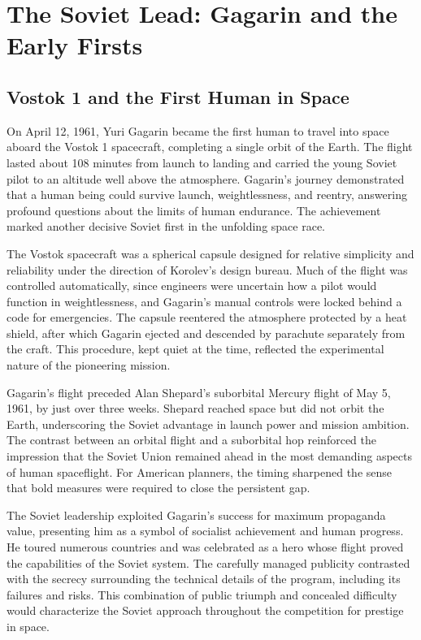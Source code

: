 \section{The Soviet Lead: Gagarin and the Early Firsts}

\subsection{Vostok 1 and the First Human in Space}
On April 12, 1961, Yuri Gagarin became the first human to travel into space aboard the Vostok 1 spacecraft, completing a single orbit of the Earth. The flight lasted about 108 minutes from launch to landing and carried the young Soviet pilot to an altitude well above the atmosphere. Gagarin's journey demonstrated that a human being could survive launch, weightlessness, and reentry, answering profound questions about the limits of human endurance. The achievement marked another decisive Soviet first in the unfolding space race.

The Vostok spacecraft was a spherical capsule designed for relative simplicity and reliability under the direction of Korolev's design bureau. Much of the flight was controlled automatically, since engineers were uncertain how a pilot would function in weightlessness, and Gagarin's manual controls were locked behind a code for emergencies. The capsule reentered the atmosphere protected by a heat shield, after which Gagarin ejected and descended by parachute separately from the craft. This procedure, kept quiet at the time, reflected the experimental nature of the pioneering mission.

Gagarin's flight preceded Alan Shepard's suborbital Mercury flight of May 5, 1961, by just over three weeks. Shepard reached space but did not orbit the Earth, underscoring the Soviet advantage in launch power and mission ambition. The contrast between an orbital flight and a suborbital hop reinforced the impression that the Soviet Union remained ahead in the most demanding aspects of human spaceflight. For American planners, the timing sharpened the sense that bold measures were required to close the persistent gap.

The Soviet leadership exploited Gagarin's success for maximum propaganda value, presenting him as a symbol of socialist achievement and human progress. He toured numerous countries and was celebrated as a hero whose flight proved the capabilities of the Soviet system. The carefully managed publicity contrasted with the secrecy surrounding the technical details of the program, including its failures and risks. This combination of public triumph and concealed difficulty would characterize the Soviet approach throughout the competition for prestige in space.


